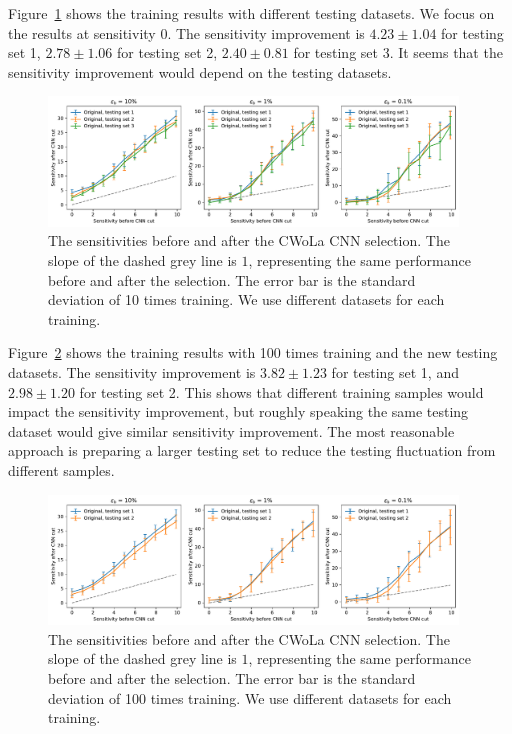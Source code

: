 \documentclass[12pt]{article}
\begin{document}
        Figure~\ref{fig:sensitivity_improvement_new_testing_data} shows the training results with different testing datasets. We focus on the results at sensitivity 0. The sensitivity improvement is $4.23 \pm 1.04$ for testing set 1, $2.78 \pm 1.06$ for testing set 2, $2.40 \pm 0.81$ for testing set 3. It seems that the sensitivity improvement would depend on the testing datasets.
        \begin{figure}[htpb]
            \centering
			\includegraphics[width=0.97\textwidth]{HVmodel_sensitivity_improvement_origin_bkg_subtraction_new_testing_set.pdf}
            \caption{The sensitivities before and after the CWoLa CNN selection. The slope of the dashed grey line is $1$, representing the same performance before and after the selection. The error bar is the standard deviation of 10 times training. We use different datasets for each training.}
            \label{fig:sensitivity_improvement_new_testing_data}
        \end{figure}

		Figure~\ref{fig:sensitivity_improvement_100_random_seed_new_testing_set} shows the training results with 100 times training and the new testing datasets. The sensitivity improvement is $3.82 \pm 1.23$ for testing set 1, and $2.98 \pm 1.20$ for testing set 2. This shows that different training samples would impact the sensitivity improvement, but roughly speaking the same testing dataset would give similar sensitivity improvement. The most reasonable approach is preparing a larger testing set to reduce the testing fluctuation from different samples.
        \begin{figure}[htpb]
            \centering
			\includegraphics[width=0.97\textwidth]{HVmodel_sensitivity_improvement_origin_bkg_subtraction_100_random_seed_new_testing_set.pdf}
            \caption{The sensitivities before and after the CWoLa CNN selection. The slope of the dashed grey line is $1$, representing the same performance before and after the selection. The error bar is the standard deviation of 100 times training. We use different datasets for each training.}
            \label{fig:sensitivity_improvement_100_random_seed_new_testing_set}
        \end{figure}
\end{document}
